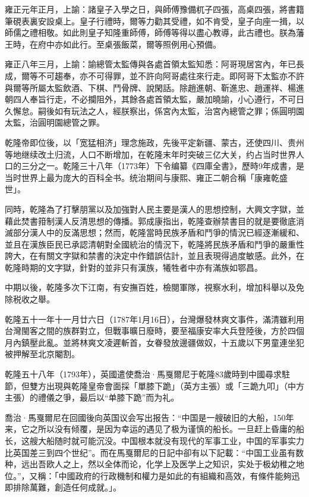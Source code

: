 雍正元年正月，上諭：諸皇子入學之日，與師傅豫備杌子四張，高桌四張，將書籍筆硯表裏安設桌上。皇子行禮時，爾等力勸其受禮，如不肯受，皇子向座一揖，以師儒之禮相敬。如此則皇子知隆重師傅，師傅等得以盡心教導，此古禮也。朕為藩王時，在府中亦如此行。至桌張飯菜，爾等照例用心預備。

雍正八年三月，上諭：諭總管太監傳與各處首領太監知悉：阿哥現居宮內，年已長成，爾等不可趨奉，亦不可得罪，並不許向阿哥處往來行走。即阿哥下太監亦不許與爾等所屬太監飲酒、下棋、鬥骨牌、說閑話。除趙進朝、靳進忠、趙運祥、楊進朝四人奉旨行走，不必攔阻外，其餘各處首領太監，嚴加曉諭，小心遵行，不可日久懈怠。嗣後如有玩法之人，經朕察出，係宮內太監，治宮內總管之罪；係圓明園太監，治圓明園總管之罪。

乾隆帝即位後，以「宽猛相济」理念施政，先後平定新疆、蒙古，还使四川、贵州等地继续改土归流，人口不断增加，在乾隆末年时突破三亿大关，约占当时世界人口的三分之一。乾隆三十八年（1773年）下令编纂《四庫全書》，歷時9年成書，是当时世界上最为庞大的百科全书。统治期间与康熙、雍正二朝合稱「康雍乾盛世」。

同時，乾隆為了打擊朋黨以及加強對人民主要是漢人的思想控制，大興文字獄，並藉此焚書箝制漢人反清思想的傳播。郭成康指出，乾隆查辦禁書目的就是要徹底消滅部分漢人中的反滿思想；然而，乾隆當時民族矛盾和鬥爭的情況已經逐漸緩和、並且在漢族臣民已承認清朝對全國統治的情況下，乾隆將民族矛盾和鬥爭的嚴重性誇大，在有關文字獄和禁書的決定中作錯誤估計，並且表現得過度敏感。此外，在乾隆時期的文字獄，針對的並非只有漢族，犧牲者中亦有滿族如鄂昌。

中期以後，乾隆多次下江南，有安撫百姓，檢閱軍隊，視察水利，增加科舉以及免除税收之舉。

乾隆五十一年十一月廿六日（1787年1月16日），台灣爆發林爽文事件，滿清雖利用台灣閩客之間的族群對立，但戰事曠日廢時，要至福康安率大兵登陸後，方於四個月內鎮壓此亂。並將林爽文凌遲斬首，女眷發放邊疆做奴，十五歲以下男童連坐犯被押解至北京閹割。

乾隆五十八年（1793年），英國遣使喬治·馬戛爾尼于乾隆83歲時到中國尋求駐節，但雙方出現與乾隆皇帝會面採「單膝下跪」（英方主張）或「三跪九叩」（中方主張）的禮儀之爭，最后以“单膝下跪”而为礼。

喬治·馬戛爾尼在回國後向英国议会写出报告：“中国是一艘破旧的大船，150年来，它之所以没有倾覆，是因为幸运的遇见了极为谨慎的船长。一旦赶上昏庸的船长，这艘大船随时就可能沉没。中国根本就没有现代的军事工业，中国的军事实力比英国差三到四个世纪”。而在馬戛爾尼的日記中卻有以下記載：“中国工业虽有数种，远出吾欧人之上，然以全体而论，化学上及医学上之知识，实处于极幼稚之地位。”，又稱：「中國政府的行政機制和權力是如此的有組織和高效，有條件能夠迅即排除萬難，創造任何成就。」。

